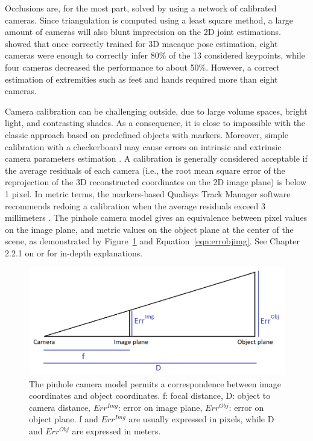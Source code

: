 Occlusions are, for the most part, solved by using a network of calibrated cameras. Since triangulation is computed using a least square method, a large amount of cameras will also blunt imprecision on the 2D joint estimations. \cite{Bala2020} showed that once correctly trained for 3D macaque pose estimation, eight cameras were enough to correctly infer 80\% of the 13 considered keypoints, while four cameras decreased the performance to about 50\%. However, a correct estimation of extremities such as feet and hands required more than eight cameras.

Camera calibration can be challenging outside, due to large volume spaces, bright light, and contrasting shades. As a consequence, it is close to impossible with the classic approach based on predefined objects with markers. Moreover, simple calibration with a checkerboard may cause errors on intrinsic and extrinsic camera parameters estimation \cite{Sun2005}. A calibration is generally considered acceptable if the average residuals of each camera (i.e., the root mean square error of the reprojection of the 3D reconstructed coordinates on the 2D image plane) is below 1 pixel. In metric terms, the markers-based Qualisys Track Manager software recommends redoing a calibration when the average residuals exceed 3 millimeters \cite{QTM2018}. The pinhole camera model gives an equivalence between pixel values on the image plane, and metric values on the object plane at the center of the scene, as demonstrated by Figure~\ref{fig_pixmeterscorrespondance} and Equation~\ref{eqn:errobjimg}. See Chapter 2.2.1 on  or \cite{Dawson-Howe1994} for in-depth explanations.

\begin{figure}[!ht]
	\centering
	\def\svgwidth{1\columnwidth}
	\fontsize{10pt}{10pt}\selectfont
	\includegraphics[width=\linewidth]{"../Chap4/Figures/Fig_PixelMeterCorrespondance.png"}
	\caption{The pinhole camera model permits a correspondence between image coordinates and object coordinates. f: focal distance, D: object to camera distance, $Err^{Img}$: error on image plane, $Err^{Obj}$: error on object plane. f and $Err^{Img}$ are usually expressed in pixels, while D and $Err^{Obj}$ are expressed in meters.}
	\label{fig_pixmeterscorrespondance}
\end{figure}


